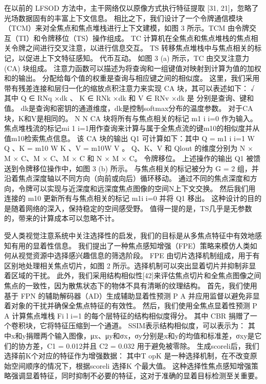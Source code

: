 
在以前的 LFSOD 方法中，主干网络仅以原像方式执行特征提取 [31, 21]，忽略了光场数据固有的丰富上下文信息。 相比之下，我们设计了一个令牌通信模块（TCM）来对全焦点和焦点堆栈进行上下文建模，如图 3 所示。TCM 由令牌交互（TI）和令牌移位（TS）操作组成。 TC 计算机在全焦点和焦点堆栈的焦点相关令牌之间进行交叉注意，以进行信息交互。 TS 转移焦点堆栈中与焦点相关的标记，以促进上下文特征感知。 代币互动。 如图 3 (a) 所示，TC 由交叉注意力 (CA) 块组成。 注意力函数可以描述为将查询和一组键值对映射到计算为值的加权和的输出。 分配给每个值的权重是查询与相应键之间的相似度。 这里，我们采用带有残差连接和层归一化的缩放点积注意力来实现 CA 块，其可以表述如下： √ 其中 Q ∈ RNq ×dk 、 K ∈ RNk ×dk 和 V ∈ RNv ×dk 是 分别是查询、键和值。 dk是查询和密钥的通道维度，dk是控制softmax分布的温度参数。 对于CA块，K和V是相同的。 { }N { }N CA 块将所有与焦点相关的标记 m1 i i=0 作为输入。 焦点堆栈流的标记mi 1 i=1用作查询来计算与属于全焦点流的键m10的相似度并从值m10检索焦点信息。 该 CA 块的输出 Q1 可计算如下：其中 Q = m1 i i=1 W Q 、K = m10 W K 、V = m10W V 。 Q、K、V 和 Qlout 的维度分别为 N × M × C、M × C、M × C 和 N × M × C。 令牌移位。 上述操作的输出 Q1 被馈送到令牌移位操作中，如图 3 (b) 所示。 与焦点相关的标记被分为 G = 2 组，并沿着焦点深度轴以不同方向（向前或向后）循环移动。 通过不同的焦点深度和方向，令牌可以实现与近深度和远深度焦点图像的空间{}N上下文交换。 然后我们用连接的 m10 更新所有与焦点相关的标记 m1i i=0 并将 Q1 移出。 这种设计的目的是随着网络的深入，保持稳定的空间感受野。 值得一提的是，TS几乎是无参数的，带来的计算成本可以忽略不计。




受人类视觉注意系统中关注选择性的启发，我们的目标是从多焦点特征中有效地感知有用的显着性信息。 我们提出了一种焦点感知增强（FPE）策略来模仿人类如何从视觉资源中选择感兴趣信息的筛选阶段。 FPE 由切片选择机制组成，用于有区别地处理相关焦点切片，如图 2 所示。选择机制可以突出显着切片并抑制非显着区域的干扰。 此外，我们采用结构相似性[42]来评估焦点切片和全焦点图像之间焦点的一致性，因为散焦状态下的物体不具有清晰的纹理结构。 首先，我们使用基于 FPN 的辅助解码器（AD）生成辅助显着性预测 P A 并应用监督以避免非显着对象的干扰并确保全焦点特征的有效性。 然后，我们使用全焦点显着性预测 P A 计算焦点堆栈 Fi l i=1 的每个层特征的结构相似度得分。 其中 CBR 捐赠了一个卷积块，它将特征压缩到一个通道。 SSIM表示结构相似度，可以表示为： 其中x和y捐赠两个输入图像，μx、μy和σx，σy分别是x和y的均值和标准差，σxy是它们的协方差，C1 = 0.012并且 C2 = 0.032 用于避免被零除。 生成scoreli后，我们选择前K个对应的特征作为增强数据：
其中T opK 是一种选择机制，在不改变原始空间顺序的情况下，根据scoreli 选择K 个最大值。 这种选择性焦点感知增强策略强调显着特征，同时抑制不必要的特征，这对于准确的显着目标检测至关重要。


